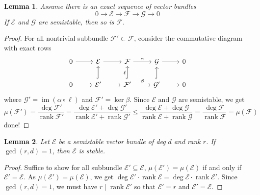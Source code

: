 \documentclass{ctexart}
\newtheorem{lemma}{Lemma}[section]
\newcommand{\rank}{\operatorname{rank}}
\newcommand{\im}{\operatorname{im}}
\begin{document}
\begin{lemma}
    Assume there is an exact sequence of vector bundles
    \begin{equation}
        0 \longrightarrow \mathcal{E} \longrightarrow \mathcal{F} \longrightarrow \mathcal{G} \longrightarrow 0
    \end{equation}
    If $\mathcal{E}$ and $\mathcal{G}$ are semistable, then so is $\mathcal{F}$.
    \label{Lemma 6.2}
\end{lemma}
\begin{proof}
    For all nontrivial subbundle $\mathcal{F}' \subset \mathcal{F}$, consider the commutative diagram with exact rows
    \begin{equation}
        \begin{tikzcd}
            0 \arrow[r] &
            \mathcal{E} \arrow[r] &
            \mathcal{F} \arrow[r, "\alpha"] &
            \mathcal{G} \arrow[r] &
            0 \\
            0 \arrow[r] &
            \mathcal{E}' \arrow[u, hookrightarrow] \arrow[r] &
            \mathcal{F}' \arrow[u, hookrightarrow, "\ell"] \arrow[r, "\beta"] &
            \mathcal{G}' \arrow[u, hookrightarrow] \arrow[r] &
            0
        \end{tikzcd}
    \end{equation}
    where $\mathcal{G}' = \im (\alpha \circ \ell)$ and $\mathcal{F}' = \ker \beta$.
    Since $\mathcal{E}$ and $\mathcal{G}$ are semistable, we get
    \begin{equation}
        \mu(\mathcal{F}') = \frac{\deg \mathcal{F}'}{\rank \mathcal{F}'} = \frac{\deg \mathcal{E}' + \deg \mathcal{G}'}{\rank \mathcal{E}' + \rank \mathcal{G}'} \le \frac{\deg \mathcal{E} + \deg \mathcal{G}}{\rank \mathcal{E} + \rank \mathcal{G}} = \frac{\deg \mathcal{F}}{\rank \mathcal{F}} = \mu(\mathcal{F})
    \end{equation}
    done!
\end{proof}
\begin{lemma}
    Let $\mathcal{E}$ be a semistable vector bundle of deg $d$ and rank $r$.
    If $\gcd (r, d) = 1$, then $\mathcal{E}$ is stable.
    \label{Lemma 6.3}
\end{lemma}
\begin{proof}
    Suffice to show for all subbundle $\mathcal{E}' \subseteq \mathcal{E}$, $\mu(\mathcal{E}') = \mu(\mathcal{E})$ if and only if $\mathcal{E}' = \mathcal{E}$.
    As $\mu(\mathcal{E}') = \mu(\mathcal{E})$, we get $\deg \mathcal{E}' \cdot \rank \mathcal{E} = \deg \mathcal{E} \cdot \rank \mathcal{E}'$.
    Since $\gcd (r, d) = 1$, we must have $r \mid \rank \mathcal{E}'$ so that $\mathcal{E}' = r$ and $\mathcal{E}' = \mathcal{E}$.
\end{proof}
\end{document}
